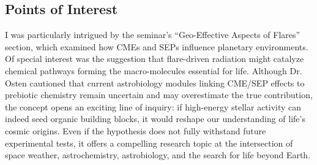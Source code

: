 \subsection*{Points of Interest}

I was particularly intrigued by the seminar’s “Geo-Effective Aspects of Flares” section, which examined how CMEs and SEPs influence planetary environments. Of special interest was the suggestion that flare-driven radiation might catalyze chemical pathways forming the macro-molecules essential for life. Although Dr. Osten cautioned that current astrobiology modules linking CME/SEP effects to prebiotic chemistry remain uncertain and may overestimate the true contribution, the concept opens an exciting line of inquiry: if high-energy stellar activity can indeed seed organic building blocks, it would reshape our understanding of life’s cosmic origins. Even if the hypothesis does not fully withstand future experimental tests, it offers a compelling research topic at the intersection of space weather, astrochemistry, astrobiology, and the search for life beyond Earth.


